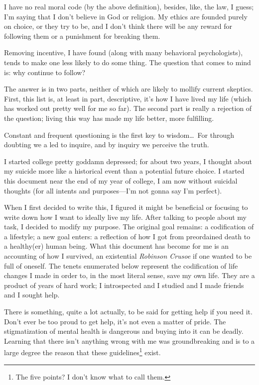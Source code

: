 \documentclass[../butidigress.tex]{subfiles}
\begin{document}
I have no real moral code (by the above definition), besides, like, the law, I guess; I'm saying that I don't believe in God or religion.
My ethics are founded purely on choice, or they try to be, and I don't think there will be any reward for following them or a punishment for breaking them.

Removing incentive, I have found (along with many behavioral psychologists), tends to make one less likely to do some thing.
The question that comes to mind is: why continue to follow?

The answer is in two parts, neither of which are likely to mollify current skeptics.
First, this list is, at least in part, descriptive, it's how I have lived my life (which has worked out pretty well for me so far).
The second part is really a rejection of the question; living this way has made my life better, more fulfilling.

\epigraph{Constant and frequent questioning is the first key to wisdom\ldots\ For through doubting we a led to inquire, and by inquiry we perceive the truth.}{}
I started college pretty goddamn depressed; for about two years, I thought about my suicide more like a historical event than a potential future choice.
I started this document near the end of my  year of college, I am now without suicidal thoughts (for all intents and purposes---I'm not gonna say I'm perfect).

When I first decided to write this, I figured it might be beneficial or focusing to write down how I want to ideally live my life.
After talking to people about my task, I decided to modify my purpose.
The original goal remains: a codification of a lifestyle; a new goal enters: a reflection of how I got from preordained death to a healthy(er) human being.
What this document has become for me is an accounting of how I survived, an existential \textit{Robinson Crusoe} if one wanted to be full of oneself.
The tenets enumerated below represent the codification of life changes I made in order to, in the most literal sense, save my own life.
They are a product of years of hard work; I introspected and I studied and I made friends and I sought help.

There is something, quite a lot actually, to be said for getting help if you need it.
Don't ever be too proud to get help, it's not even a matter of pride.
The stigmatization of mental health is dangerous and buying into it can be deadly.
Learning that there isn't anything wrong with me was groundbreaking and is to a large degree the reason that these guidelines\footnote{The five points? I don't know what to call them.} exist.
\end{document}
